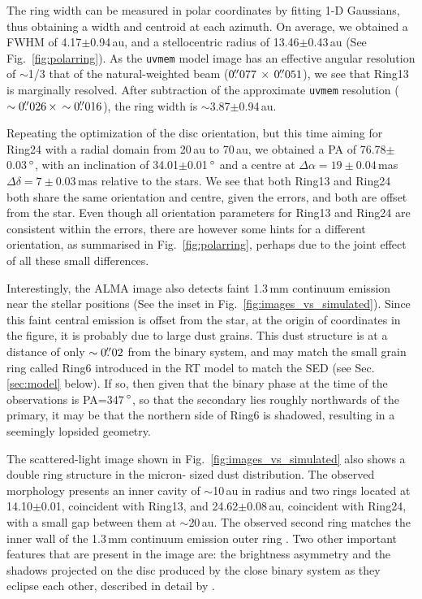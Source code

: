 \documentclass[letters,usenatbib,times]{mnras}
\begin{document}
The ring width can be measured in polar coordinates by fitting 1-D Gaussians, thus obtaining a width and centroid at each azimuth. On average, we obtained a FWHM of 4.17$\pm$0.94\,au, and a stellocentric radius of 13.46$\pm$0.43\,au (See Fig.~\ref{fig:polarring}). As the {\tt uvmem} model image has an effective angular resolution of $\sim$1/3 that of the natural-weighted beam ($0\hbox{$.\!\!^{\prime\prime}$}077 \,\times \, 0\hbox{$.\!\!^{\prime\prime}$}051$), we see that Ring13 is marginally resolved. After subtraction of the approximate {\tt uvmem} resolution ($\sim0\hbox{$.\!\!^{\prime\prime}$}026 \, \times \, \sim0\hbox{$.\!\!^{\prime\prime}$}016$), the ring width is $\sim$3.87$\pm$0.94\,au. 

Repeating the optimization of the disc orientation, but this time aiming for Ring24 with a radial domain from 20\,au to 70\,au, we obtained a PA of 76.78$\pm$0.03\,$\hbox{$^\circ$}$, with an inclination of 34.01$\pm$0.01\,$\hbox{$^\circ$}$ and a centre at $\Delta \alpha = 19\pm0.04$\,mas $\Delta \delta = 7\pm0.03$\,mas relative to the stars. We see that both Ring13 and Ring24 both share the same orientation and centre, given the errors, and both are offset from the star. Even though all orientation parameters for Ring13 and Ring24 are consistent within the errors, there are however some hints for a different orientation, as summarised in Fig.~\ref{fig:polarring}, perhaps due to the joint effect of all these small differences.

Interestingly, the ALMA image also detects faint 1.3\,mm continuum emission near the stellar positions (See the inset in Fig.~\ref{fig:images_vs_simulated}). Since this faint central emission is offset from the star, at the origin of coordinates in the figure, it is probably due to large dust grains. This dust structure is at a distance of only $\sim0\hbox{$.\!\!^{\prime\prime}$}02$ from the binary system, and may match the small grain ring called Ring6 introduced in the RT model to match the SED (see Sec.\,\ref{sec:model} below). If so, then given that the binary phase at the time of the observations is PA=347\,$\hbox{$^\circ$}$, so that the secondary lies roughly northwards of the primary, it may be that the northern side of Ring6 is shadowed, resulting in a seemingly lopsided geometry.

The scattered-light image shown in Fig.~\ref{fig:images_vs_simulated} also shows a double ring structure in the micron-
sized dust distribution. The observed morphology presents an inner cavity of $\sim$10\,au in radius and two rings located at 14.10$\pm$0.01, coincident with Ring13, and 24.62$\pm$0.08\,au, coincident with Ring24, with a small gap between them at $\sim$20\,au. The observed second ring matches the inner wall of the 1.3\,mm continuum emission outer ring \citep{Ru_z_Rodr_guez_2019}. Two other important features that are present in the image are: the brightness asymmetry and the shadows projected on the disc produced by the close binary system as they eclipse each other, described in detail by \citet{dOrazi}.
\end{document}
